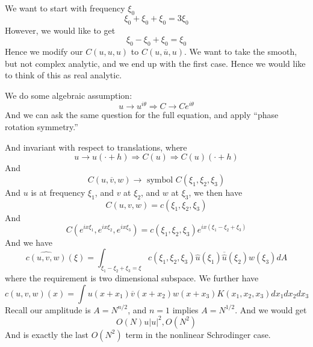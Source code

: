 We want to start with frequency $\xi_0$
\begin{equation*}
    \xi_0+\xi_0+\xi_0=3\xi_0
\end{equation*}
However, we would like to get 
\begin{equation*}
    \xi_0-\xi_0+\xi_0=\xi_0
\end{equation*}
Hence we modify our $C(u,u,u)$ to $C(u,\overline{u}, u)$. We want to take the smooth, but not complex analytic, and we end up with the first case. Hence we would like to think of this as real analytic.

We do some algebraic assumption:
\begin{equation*}
    u\to u^{i\theta}\Rightarrow C\to Ce^{i\theta}
\end{equation*}
And we can ask the same question for the full equation, and apply ``phase rotation symmetry.''

And invariant with respect to translations, where 
\begin{equation*}
    u\to u(\cdot+h)\Rightarrow C(u)\Rightarrow C(u)(\cdot+h)
\end{equation*}
And 
\begin{equation*}
    C(u,\overline{v},w)\to \text{ symbol } C(\xi_1, \xi_2, \xi_3)
\end{equation*}
And $u$ is at frequency $\xi_1$, and $v$ at $\xi_2$, and $w$ at $\xi_3$, we then have 
\begin{equation*}
    C(u,v,w)=c(\xi_1,\xi_2,\xi_3)
\end{equation*}
And 
\begin{equation*}
    C(e^{ix\xi_1}, e^{ix\xi_2}, e^{ix\xi_3} )=c(\xi_1, \xi_2,\xi_3)e^{ix(\xi_1-\xi_2+\xi_3)}
\end{equation*}
And we have 
\begin{equation*}
    \widehat{c(u,v,w)}(\xi)=\int_{\xi_1-\xi_2+\xi_3=\xi}c(\xi_1,\xi_2,\xi_3)\widehat{u}(\xi_1)\overline{\hat{u}}(\xi_2) w(\xi_3)dA
\end{equation*}
where the requirement is two dimensional subspace. We further have 
\begin{equation*}
    c(u,v,w)(x)=\int u(x+x_1)\overline{v}(x+x_2)w(x+x_3)K(x_1, x_2, x_3)dx_1dx_2dx_3
\end{equation*}
Recall our amplitude is $A=N^{n/2}$, and $n=1$ implies $A=N^{1/2}$.  And we would get 
\begin{equation*}
    O(N)u|u|^2, O(N^2)
\end{equation*}
And is exactly the last $O(N^2)$ term in the nonlinear Schrodinger case.

